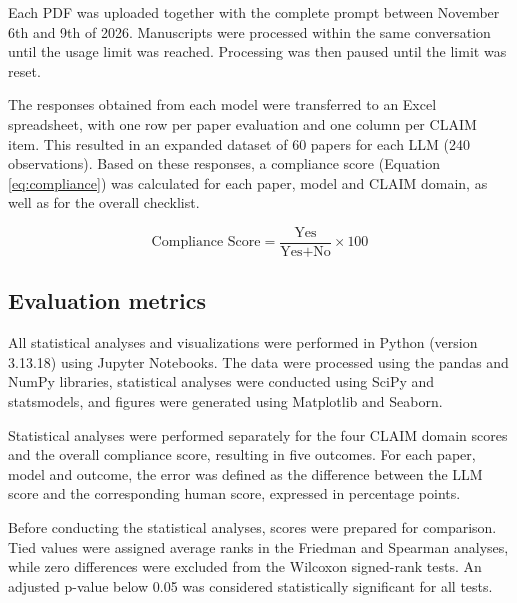 Each PDF was uploaded together with the complete prompt between November 6th and 9th of 2026. Manuscripts were processed within the same conversation until the usage limit was reached. Processing was then paused until the limit was reset. 

The responses obtained from each model were transferred to an Excel spreadsheet, with one row per paper evaluation and one column per CLAIM item. This resulted in an expanded dataset of 60 papers for each LLM (240 observations). Based on these responses, a compliance score (Equation \ref{eq:compliance}) was calculated for each paper, model and CLAIM domain, as well as for the overall checklist. 

\begin{equation}
\text{Compliance Score} = \frac{\text{Yes}}{\text{Yes}+\text{No}} \times 100
\label{eq:compliance}
\end{equation}

\subsection{Evaluation metrics}
All statistical analyses and visualizations were performed in Python (version 3.13.18) using Jupyter Notebooks. The data were processed using the pandas and NumPy libraries, statistical analyses were conducted using SciPy and statsmodels, and figures were generated using Matplotlib and Seaborn.


Statistical analyses were performed separately for the four CLAIM domain scores and the overall compliance score, resulting in five outcomes. For each paper, model and outcome, the error was defined as the difference between the LLM score and the corresponding human score, expressed in percentage points.

Before conducting the statistical analyses, scores were prepared for comparison. Tied values were assigned average ranks in the Friedman and Spearman analyses, while zero differences were excluded from the Wilcoxon signed-rank tests. An adjusted p-value below 0.05 was considered statistically significant for all tests. 

